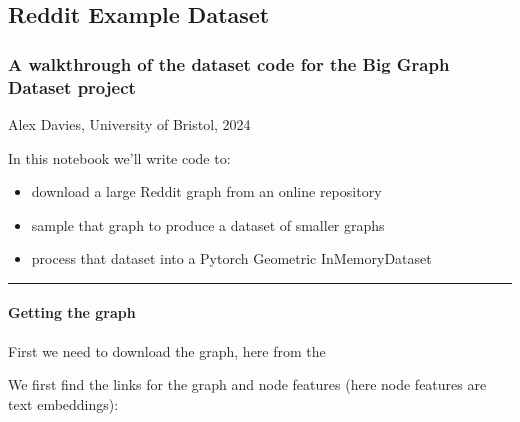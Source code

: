 \documentclass[letterpaper,10pt,english]{sphinxhowto}
\begin{document}
\sphinxstepscope


\subsection{Reddit Example Dataset}
\label{\detokenize{reddit-dataset-example:Reddit-Example-Dataset}}\label{\detokenize{reddit-dataset-example::doc}}

\subsubsection{A walkthrough of the dataset code for the Big Graph Dataset project}
\label{\detokenize{reddit-dataset-example:A-walkthrough-of-the-dataset-code-for-the-Big-Graph-Dataset-project}}
\sphinxAtStartPar
Alex Davies, University of Bristol, 2024

\sphinxAtStartPar
In this notebook we’ll write code to:
\begin{itemize}
\item {} 
\sphinxAtStartPar
download a large Reddit graph from an online repository

\item {} 
\sphinxAtStartPar
sample that graph to produce a dataset of smaller graphs

\item {} 
\sphinxAtStartPar
process that dataset into a Pytorch Geometric InMemoryDataset

\end{itemize}


\bigskip\hrule\bigskip



\paragraph{Getting the graph}
\label{\detokenize{reddit-dataset-example:Getting-the-graph}}
\sphinxAtStartPar
First we need to download the graph, here from the 

\sphinxAtStartPar
We first find the links for the graph and node features (here node features are text embeddings):
\end{document}
